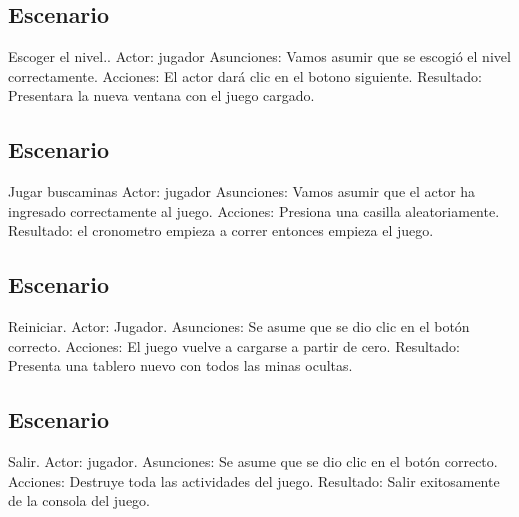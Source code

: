 \subsection{Escenario}
 
Escoger el nivel..\newline\newline
Actor: jugador
Asunciones: Vamos asumir que se escogió el nivel correctamente.\newline
Acciones: El actor dará clic en el botono siguiente.\newline
Resultado: Presentara la nueva ventana con el juego cargado.\newline

\subsection{Escenario}
Jugar buscaminas\newline \newline
Actor: jugador\newline
Asunciones: Vamos asumir que el actor ha ingresado correctamente al juego.\newline
Acciones: Presiona una casilla aleatoriamente.\newline
Resultado: el cronometro empieza a correr entonces empieza el juego.\newline

\subsection{Escenario}
Reiniciar.\newline \newline
Actor: Jugador. \newline
Asunciones: Se asume que se dio clic en el botón correcto.\newline
Acciones: El  juego vuelve a cargarse a partir de cero.\newline
Resultado: Presenta una tablero nuevo con todos las minas ocultas.\newline

\subsection{Escenario}
Salir.\newline \newline
Actor: jugador.\newline
Asunciones: Se asume que se dio clic en el botón  correcto.\newline
Acciones: Destruye toda las actividades del juego.\newline
Resultado: Salir exitosamente  de la consola del juego.\newline
\newpage


